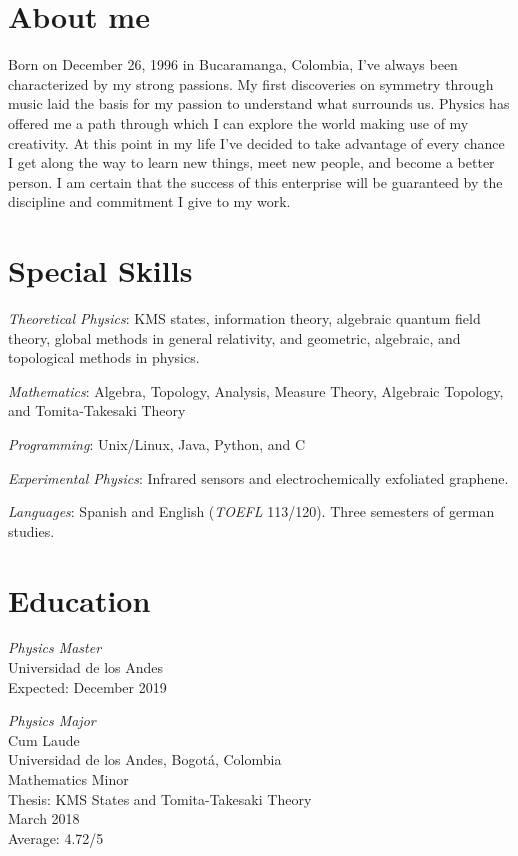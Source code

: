 \documentclass[line,margin]{res}
\begin{document}
\address{ivanmbur@gmail.com\\ Cr. 19 63 27, Bogotá, Colombia\\ (+57) 316 782 1110}

\begin{resume}

\section{About me}

Born on December 26, 1996 in Bucaramanga, Colombia, I've always been characterized by my strong passions. My first discoveries on symmetry through music laid the basis for my passion to understand what surrounds us. Physics has offered me a path through which I can explore the world making use of my creativity. At this point in my life I've decided to take advantage of every chance I get along the way to learn new things, meet new people, and become a better person. I am certain that the success of this enterprise will be guaranteed by the discipline and commitment I give to my work. 

\section{Special Skills}

{\sl Theoretical Physics}: KMS states, information theory, algebraic quantum field theory, global methods in general relativity, and geometric, algebraic, and topological methods in physics.

{\sl Mathematics}: Algebra, Topology, Analysis, Measure Theory, Algebraic Topology, and Tomita-Takesaki Theory

{\sl Programming}: Unix/Linux, Java, Python, and C

{\sl Experimental Physics}: Infrared sensors and electrochemically exfoliated graphene. 

{\sl Languages}: Spanish and English ({\sl TOEFL} 113/120). Three semesters of german studies.

\section{Education}

{\sl Physics Master}\\
Universidad de los Andes\\
Expected: December 2019

{\sl Physics Major}\\
Cum Laude\\
Universidad de los Andes, Bogotá, Colombia \\
Mathematics Minor \\
Thesis: KMS States and Tomita-Takesaki Theory \\
March 2018 \\
Average: 4.72/5


\end{resume}
\end{document}
